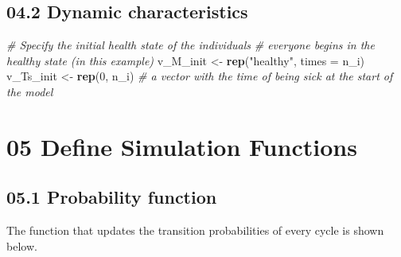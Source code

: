 \documentclass[
]{article}
\newenvironment{Shaded}{\begin{snugshade}}{\end{snugshade}}
\newcommand{\CommentTok}[1]{\textcolor[rgb]{0.56,0.35,0.01}{\textit{#1}}}
\newcommand{\DataTypeTok}[1]{\textcolor[rgb]{0.13,0.29,0.53}{#1}}
\newcommand{\DecValTok}[1]{\textcolor[rgb]{0.00,0.00,0.81}{#1}}
\newcommand{\KeywordTok}[1]{\textcolor[rgb]{0.13,0.29,0.53}{\textbf{#1}}}
\newcommand{\NormalTok}[1]{#1}
\newcommand{\StringTok}[1]{\textcolor[rgb]{0.31,0.60,0.02}{#1}}
\begin{document}
\hypertarget{dynamic-characteristics}{%
\subsection{04.2 Dynamic
characteristics}\label{dynamic-characteristics}}

\begin{Shaded}
\begin{Highlighting}[]
\CommentTok{# Specify the initial health state of the individuals }
\CommentTok{# everyone begins in the healthy state (in this example)}
\NormalTok{v_M_init  <-}\StringTok{ }\KeywordTok{rep}\NormalTok{(}\StringTok{"healthy"}\NormalTok{, }\DataTypeTok{times =}\NormalTok{ n_i)   }
\NormalTok{v_Ts_init <-}\StringTok{ }\KeywordTok{rep}\NormalTok{(}\DecValTok{0}\NormalTok{, n_i)  }\CommentTok{# a vector with the time of being sick at the start of the model }
\end{Highlighting}
\end{Shaded}

\hypertarget{define-simulation-functions}{%
\section{05 Define Simulation
Functions}\label{define-simulation-functions}}

\hypertarget{probability-function}{%
\subsection{05.1 Probability function}\label{probability-function}}

The function that updates the transition probabilities of every cycle is
shown below.
\end{document}

